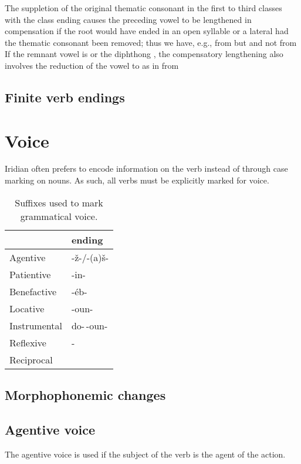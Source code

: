 The suppletion of the original thematic consonant in the first to third classes with the class ending causes the preceding vowel to be lengthened in compensation if the root would have ended in an open syllable or a lateral had the thematic consonant been removed; thus we have, e.g.,  from  but  and not  from  If the remnant vowel is  or the diphthong , the compensatory lengthening also involves the reduction of the vowel to  as in  from 

\subsection{Finite verb endings}

\section{Voice}

Iridian often prefers to encode information on the verb instead of through case marking on nouns. As such, all verbs must be explicitly marked for voice.
\begin{table}[!ht]
	\sffamily\footnotesize
	\caption{Suffixes used to mark grammatical voice.}\medskip
	\begin{tabu} to 0.5
		\toprule
		&{\cscaps ending}\\
		\midrule
		Agentive	& {-\v{z}-/-(a)š-}\\
		Patientive	& {-in-}\\ 
		Benefactive	& {-éb-}\\ 
		Locative	& {-oun-}\\ 
		Instrumental& {do-\,-oun-}\\ 
		Reflexive	& -\\ 
		Reciprocal	& \\ 
		\bottomrule
	\end{tabu}
\end{table}

\subsection{Morphophonemic changes}


\subsection{Agentive voice}
\par The agentive voice is used if the subject of the verb is the agent of the action.

